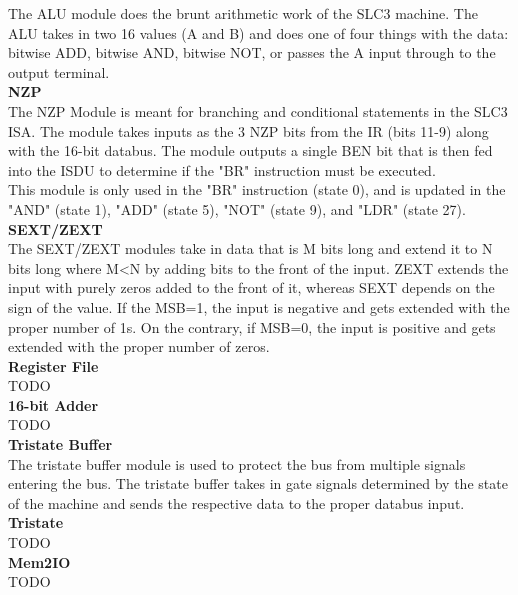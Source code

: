 \documentclass[journal, twocolumn, final,11pt,letterpaper]{IEEEtran}
\begin{document}
The ALU module does the brunt arithmetic work of the SLC3 machine.  The ALU takes in two 16 values (A and B) and does one of four things with the data: bitwise ADD, bitwise AND, bitwise NOT, or passes the A input through to the output terminal. \\

\normalsize\textbf{NZP} \\
The NZP Module is meant for branching and conditional statements in the SLC3 ISA. The module takes inputs as the 3 NZP bits from the IR (bits 11-9) along with the 16-bit databus. The module outputs a single BEN bit that is then fed into the ISDU to determine if the "BR" instruction must be executed. \\

This module is only used in the "BR" instruction (state 0), and is updated in the "AND" (state 1), "ADD" (state 5), "NOT" (state 9), and "LDR" (state 27). \\


\normalsize\textbf{SEXT/ZEXT} \\

The SEXT/ZEXT modules take in data that is M bits long and extend it to N bits long where M<N by adding bits to the front of the input.  ZEXT extends the input with purely zeros added to the front of it, whereas SEXT depends on the sign of the value.  If the MSB=1, the input is negative and gets extended with the proper number of 1s.  On the contrary, if MSB=0, the input is positive and gets extended with the proper number of zeros.  \\

\normalsize\textbf{Register File} \\
TODO \\

\normalsize\textbf{16-bit Adder} \\
TODO \\

\normalsize\textbf{Tristate Buffer} \\
The tristate buffer module is used to protect the bus from multiple signals entering the bus.  The tristate buffer takes in gate signals determined by the state of the machine and sends the respective data to the proper databus input. \\

\normalsize\textbf{Tristate} \\
TODO \\

\normalsize\textbf{Mem2IO} \\
TODO \\
\end{document}
